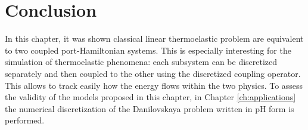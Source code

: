 \section{Conclusion}
In this chapter, it was shown classical linear thermoelastic problem are equivalent to two coupled port-Hamiltonian systems. This is especially interesting for the simulation of thermoelastic phenomena: each subsystem can be discretized separately and then coupled to the other using the discretized coupling operator. This allows to track easily how the energy flows within the two physics. To assess the validity of the models proposed in this chapter, in Chapter \ref{ch:applications} the numerical discretization of the Danilovskaya problem \cite{danilovskaya1950} written in pH form is performed.




